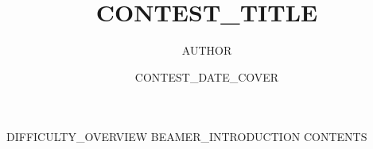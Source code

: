 \documentclass[aspectratio=169,UTF8,11pt,fontset=none]{ctexbeamer}
\title{ {{CONTEST_TITLE}} }
\author{ {{AUTHOR}} }
\date{ {{CONTEST_DATE_COVER}} }
\begin{document}
\begin{frame}\titlepage\end{frame}
{{DIFFICULTY_OVERVIEW}}
{{BEAMER_INTRODUCTION}}
{{CONTENTS}}
\end{document}
